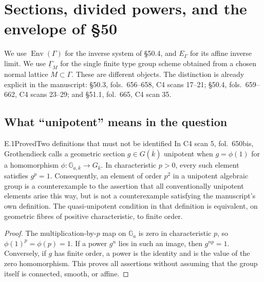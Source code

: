 \section{Sections, divided powers, and the envelope of \S50}
\label{sec:E}

We use \(\operatorname{Env}(\Gamma)\) for the inverse system of \S50.4,
and \(E_\Gamma\) for its affine inverse limit.  We use
\(\underline\Gamma_M\) for the single finite type group scheme obtained
from a chosen normal lattice \(M\subset\Gamma\).  These are different
objects.  The distinction is already explicit in the manuscript:
\S50.3, fols.~656--658, C4 scans 17--21; \S50.4, fols.~659--662,
C4 scans 23--29; and \S51.1, fol.~665, C4 scan 35.

\subsection{What ``unipotent'' means in the question}

\begin{statement}{E.1}{Proved}{Two definitions that must not be identified}
In C4 scan 5, fol.~650bis, Grothendieck calls a geometric section
\(g\in G(\overline k)\) unipotent when
\(g=\phi(1)\) for a homomorphism
\(\phi:\mathbb G_{a,\overline k}\to G_{\overline k}\).
In characteristic \(p>0\), every such element satisfies \(g^p=1\).
Consequently, an element of order \(p^2\) in a unipotent algebraic group
is a counterexample to the assertion that all conventionally unipotent
elements arise this way, but is not a counterexample satisfying the
manuscript's own definition.  The quasi-unipotent condition in that
definition is equivalent, on geometric fibres of positive characteristic,
to finite order.
\end{statement}
\begin{proof}
The multiplication-by-\(p\) map on \(\mathbb G_a\) is zero in
characteristic \(p\), so \(\phi(1)^p=\phi(p)=1\).
If a power \(g^n\) lies in such an image, then \(g^{np}=1\).
Conversely, if \(g\) has finite order, a power is the identity and is
the value of the zero homomorphism.  This proves all assertions without
assuming that the group itself is connected, smooth, or affine.
\end{proof}


